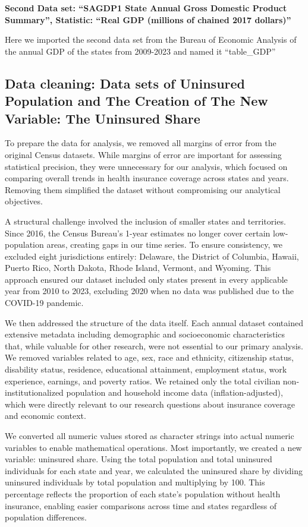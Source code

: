 \documentclass[
]{article}
\begin{document}
\textbf{Second Data set: ``SAGDP1 State Annual Gross Domestic Product
Summary'', Statistic: ``Real GDP (millions of chained 2017 dollars)''}

Here we imported the second data set from the Bureau of Economic
Analysis of the annual GDP of the states from 2009-2023 and named it
``table\_GDP''

\subsection{Data cleaning: Data sets of Uninsured Population and The
Creation of The New Variable: The Uninsured
Share}\label{data-cleaning-data-sets-of-uninsured-population-and-the-creation-of-the-new-variable-the-uninsured-share}

To prepare the data for analysis, we removed all margins of error from
the original Census datasets. While margins of error are important for
assessing statistical precision, they were unnecessary for our analysis,
which focused on comparing overall trends in health insurance coverage
across states and years. Removing them simplified the dataset without
compromising our analytical objectives.

A structural challenge involved the inclusion of smaller states and
territories. Since 2016, the Census Bureau's 1-year estimates no longer
cover certain low-population areas, creating gaps in our time series. To
ensure consistency, we excluded eight jurisdictions entirely: Delaware,
the District of Columbia, Hawaii, Puerto Rico, North Dakota, Rhode
Island, Vermont, and Wyoming. This approach ensured our dataset included
only states present in every applicable year from 2010 to 2023,
excluding 2020 when no data was published due to the COVID-19 pandemic.

We then addressed the structure of the data itself. Each annual dataset
contained extensive metadata including demographic and socioeconomic
characteristics that, while valuable for other research, were not
essential to our primary analysis. We removed variables related to age,
sex, race and ethnicity, citizenship status, disability status,
residence, educational attainment, employment status, work experience,
earnings, and poverty ratios. We retained only the total civilian
non-institutionalized population and household income data
(inflation-adjusted), which were directly relevant to our research
questions about insurance coverage and economic context.

We converted all numeric values stored as character strings into actual
numeric variables to enable mathematical operations. Most importantly,
we created a new variable: uninsured share. Using the total population
and total uninsured individuals for each state and year, we calculated
the uninsured share by dividing uninsured individuals by total
population and multiplying by 100. This percentage reflects the
proportion of each state's population without health insurance, enabling
easier comparisons across time and states regardless of population
differences.
\end{document}
